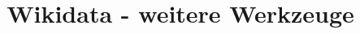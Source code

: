 \documentclass{article}
\begin{document}
\title{Wikidata - weitere Werkzeuge}

\maketitle
\end{document}
